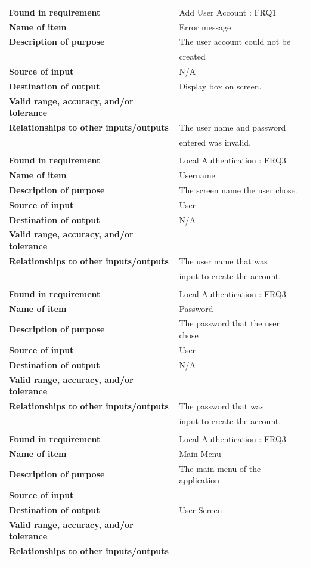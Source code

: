 \begin{tabular}{ll}
\textbf{Found in requirement}&Add User Account : FRQ1\\
\textbf{Name of item}&Error message\\
\textbf{Description of purpose}&The user account could not be\\& created\\
\textbf{Source of input}&N/A\\
\textbf{Destination of output}&Display box on screen.\\
\textbf{Valid range, accuracy, and/or tolerance}&\\
\textbf{Relationships to other inputs/outputs}&The user name and password \\& entered was invalid.\\
&\\
\textbf{Found in requirement}&Local Authentication : FRQ3\\
\textbf{Name of item}&Username\\
\textbf{Description of purpose}&The screen name the user chose.\\
\textbf{Source of input}&User\\
\textbf{Destination of output}&N/A\\
\textbf{Valid range, accuracy, and/or tolerance}&\\
\textbf{Relationships to other inputs/outputs}&The user name that was\\&  input to create the account.\\
&\\
\textbf{Found in requirement}&Local Authentication : FRQ3\\
\textbf{Name of item}&Password\\
\textbf{Description of purpose}&The password that the user chose\\
\textbf{Source of input}&User\\
\textbf{Destination of output}&N/A\\
\textbf{Valid range, accuracy, and/or tolerance}&\\
\textbf{Relationships to other inputs/outputs}&The password that was \\&input to create the account.\\
&\\
\textbf{Found in requirement}&Local Authentication : FRQ3\\
\textbf{Name of item}&Main Menu\\
\textbf{Description of purpose}&The main menu of the application\\
\textbf{Source of input}&\\
\textbf{Destination of output}&User Screen\\
\textbf{Valid range, accuracy, and/or tolerance}&\\
\textbf{Relationships to other inputs/outputs}&\\
&\\
\end{tabular}
